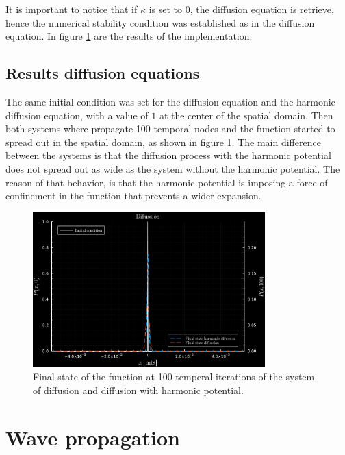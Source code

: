 \documentclass[main.tex]{subfiles}
\begin{document}
It is important to notice that if $\kappa$ is set to $0$, the diffusion equation is retrieve, hence the numerical stability condition was established as in the diffusion equation.
In figure \ref{fig8:diffusionResults} are the results of the implementation.

\subsection{Results diffusion equations}

The same initial condition was set for the diffusion equation and the harmonic diffusion equation, with a value of $1$ at the center of the spatial domain.
Then both systems where propagate 100 temporal nodes and the function started to spread out in the spatial domain, as shown in figure \ref{fig8:diffusionResults}.
The main difference between the systems is that the diffusion process with the harmonic potential does not spread out as wide as the system without the harmonic potential.
The reason of that behavior, is that the harmonic potential is imposing a force of confinement in the function that prevents a wider expansion.

\begin{figure}[ht!]
    \centering
    \includegraphics[width=0.8\textwidth]{imgs/hw8/difussionSols.pdf}
    \caption{Final state of the function at 100 temperal iterations of the system of diffusion and diffusion with harmonic potential.}
    \label{fig8:diffusionResults}
\end{figure}

\section{Wave propagation}
\end{document}
